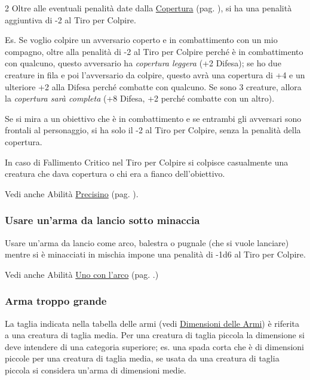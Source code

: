 \begin{multicols}{2}
Oltre alle eventuali penalità date dalla \hyperlink{esempicopertura}{Copertura} (pag. \pageref{esempicopertura}), si ha una penalità aggiuntiva di -2 al Tiro per Colpire.

Es. Se voglio colpire un avversario coperto e in combattimento con un mio compagno, oltre alla penalità di -2 al Tiro per Colpire perché è in combattimento con qualcuno, questo avversario ha \emph{copertura leggera} (+2 Difesa); se ho due creature in fila e poi l'avversario da colpire, questo avrà una copertura di +4 e un ulteriore +2 alla Difesa perché combatte con qualcuno.
Se sono 3 creature, allora la \emph{copertura sarà completa} (+8 Difesa, +2 perché combatte con un altro).

Se si mira a un obiettivo che è in combattimento e se entrambi gli avversari sono frontali al personaggio, si ha solo il -2 al Tiro per Colpire, senza la penalità della copertura.

In caso di Fallimento Critico nel Tiro per Colpire si colpisce casualmente una creatura che dava copertura o chi era a fianco dell'obiettivo.

Vedi anche Abilità \hyperlink{Precisino}{Precisino} (pag. \pageref{Precisino}).

\subsubsection{Usare un'arma da lancio sotto minaccia} \label{usarearmalanciosottominaccia}

Usare un'arma da lancio come arco, balestra o pugnale (che si vuole lanciare) mentre si è minacciati in mischia impone una penalità di -1d6 al Tiro per Colpire.

Vedi anche Abilità \hyperlink{Uno con l'arco}{Uno con l'arco} (pag. \pageref{Uno con l'arco}.)

\medskip
\subsubsection{Arma troppo grande} \label{armatroppogrande}

La taglia indicata nella tabella delle armi (vedi \hyperlink{dimensionediunarma}{Dimensioni delle Armi}) è riferita a una creatura di taglia media. Per una creatura di taglia piccola la dimensione si deve intendere di una categoria superiore; es. una spada corta che è di dimensioni piccole per una creatura di taglia media, se usata da una creatura di taglia piccola si considera un'arma di dimensioni medie.



\end{multicols}
